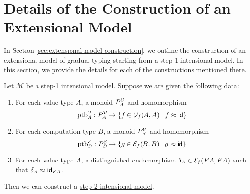 \section{Details of the Construction of an Extensional Model}

In Section \ref{sec:extensional-model-construction}, we outline the construction
of an extensional model of gradual typing starting from a step-1 intensional model.
In this section, we provide the details for each of the constructions mentioned there.

\begin{lemma}\label{lem:step-1-model-to-step-2-model}
Let $\mathcal M$ be a \hyperref[def:step-1-model]{step-1 intensional model}.
Suppose we are given the following data:

\begin{enumerate}
    \item For each value type $A$, a monoid $P^{\mathcal{V}}_A$ and homomorphism 
    \[ \text{ptb}^\mathcal{V}_A : P^{\mathcal{V}}_A \to \{ f \in \mathcal{V}_f(A,A) \mid f \approx \mathsf{id} \} \]

    \item For each computation type $B$, a monoid $P^{\mathcal{V}}_B$ and homomorphism
    \[ \text{ptb}^\mathcal{E}_B : P^{\mathcal{E}}_B \to \{ g \in \mathcal{E}_f(B,B) \mid g \approx \mathsf{id} \} \]

    \item For each value type $A$, a distinguished endomorphism
    $\delta_A \in \mathcal{E}_f(FA, FA)$ such that $\delta_A \approx \mathsf{id}_{FA}$.
\end{enumerate}

Then we can construct a \hyperref[def:step-2-model]{step-2 intensional model}.
\end{lemma}
